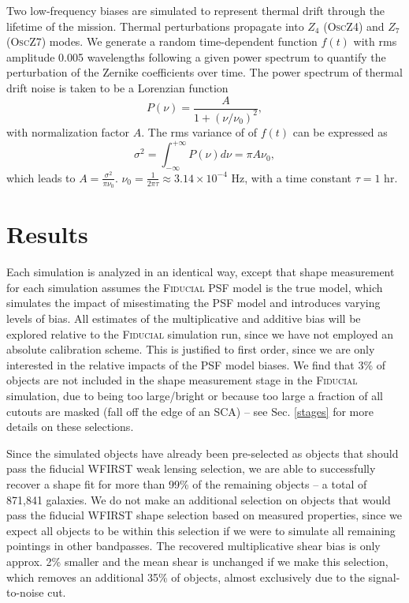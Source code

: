 \documentclass[aps,prd, amsmath,amssymb,superscriptaddress,showkeys,nofootinbib,reprint,preprintnumbers]{revtex4-1}
\begin{document}
Two low-frequency biases are simulated to represent thermal drift through the lifetime of the mission. Thermal perturbations propagate into $Z_4$ (\textsc{OscZ4})  and $Z_7$ (\textsc{OscZ7}) modes.
We generate a random time-dependent function $f(t)$ with rms amplitude 0.005 wavelengths following a given power spectrum to quantify the perturbation of the Zernike coefficients over time. 
The power spectrum of thermal drift noise is taken to be a Lorenzian function 
\begin{equation}
P(\nu)=\frac{A}{1+(\nu/\nu_0)^2},
\end{equation}
with normalization factor $A$. The rms variance of of $f(t)$ can be expressed as
\begin{equation}
\sigma^2 = \int_{-\infty}^{+\infty}P(\nu)d\nu=\pi A\nu_0,
\end{equation}
which leads to $A=\frac{\sigma^2}{\pi\nu_0}$. $\nu_0=\frac{1}{2\pi\tau}\approx 3.14\times10^{-4}$ Hz, with a time constant $\tau=1$ hr.

\section{Results}\label{sec:results2}

Each simulation is analyzed in an identical way, except that shape measurement for each simulation assumes the \textsc{Fiducial} PSF model is the true model, which simulates the impact of misestimating the PSF model and introduces varying levels of bias. 
All estimates of the multiplicative and additive bias will be explored relative to the \textsc{Fiducial} simulation run, since we have not employed an absolute calibration scheme. 
This is justified to first order, since we are only interested in the relative impacts of the PSF model biases.
We find that 3\% of objects are not included in the shape measurement stage in the \textsc{Fiducial} simulation, due to being too large/bright or because too large a fraction of all cutouts are masked (fall off the edge of an SCA) -- see Sec. \ref{stages} for more details on these selections. 

Since the simulated objects have already been pre-selected as objects that should pass the fiducial WFIRST weak lensing selection, we are able to successfully recover a shape fit for more than 99\% of the remaining objects -- a total of 871,841 galaxies. 
We do not make an additional selection on objects that would pass the fiducial WFIRST shape selection based on measured properties, since we expect all objects to be within this selection if we were to simulate all remaining pointings in other bandpasses. 
The recovered multiplicative shear bias is only approx. 2\% smaller and the mean shear is unchanged if we make this selection, which removes an additional 35\% of objects, almost exclusively due to the signal-to-noise cut.
\end{document}
